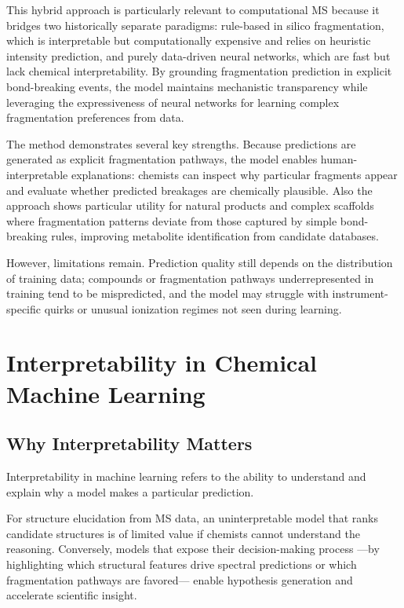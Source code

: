 This hybrid approach is particularly relevant to computational MS because it bridges two historically separate paradigms: rule-based in silico fragmentation, which is interpretable but computationally expensive and relies on heuristic intensity prediction, and purely data-driven neural networks, which are fast but lack chemical interpretability. \cite[p.~3420]{Goldman2024}
By grounding fragmentation prediction in explicit bond-breaking events, the model maintains mechanistic transparency while leveraging the expressiveness of neural networks for learning complex fragmentation preferences from data.

The method demonstrates several key strengths. 
Because predictions are generated as explicit fragmentation pathways, the model enables human-interpretable explanations: chemists can inspect why particular fragments appear and evaluate whether predicted breakages are chemically plausible. 
Also the approach shows particular utility for natural products and complex scaffolds where fragmentation patterns deviate from those captured by simple bond-breaking rules, improving metabolite identification from candidate databases. \cite[p.~3427]{Goldman2024}

However, limitations remain.
Prediction quality still depends on the distribution of training data; compounds or fragmentation pathways underrepresented in training tend to be mispredicted, and the model may struggle with instrument-specific quirks or unusual ionization regimes not seen during learning.


\section{Interpretability in Chemical Machine Learning}
\subsection{Why Interpretability Matters}

Interpretability in machine learning refers to the ability to understand and explain why a model makes a particular prediction. \cite[p.~1]{Montavon2018}

For structure elucidation from MS data, an uninterpretable model that ranks candidate structures is of limited value if chemists cannot understand the reasoning. 
Conversely, models that expose their decision-making process \cite[p.~2]{Montavon2018} ---by highlighting which structural features drive spectral predictions or which fragmentation pathways are favored--- enable hypothesis generation and accelerate scientific insight.

